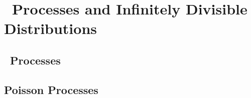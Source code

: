 \chapter{\levy\ Processes and Infinitely Divisible Distributions}

\section{\levy\ Processes}

\section{Poisson Processes}